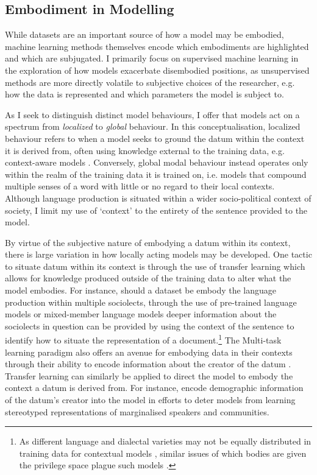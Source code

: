 \subsection{Embodiment in Modelling}

While datasets are an important source of how a model may be embodied, machine learning methods themselves encode which embodiments are highlighted and which are subjugated. I primarily focus on supervised machine learning in the exploration of how models exacerbate disembodied positions, as unsupervised methods are more directly volatile to subjective choices of the researcher, e.g. how the data is represented and which parameters the model is subject to.

As I seek to distinguish distinct model behaviours, I offer that models act on a spectrum from \textit{localized} to \textit{global} behaviour. In this conceptualisation, localized behaviour refers to when a model seeks to ground the datum within the context it is derived from, often using knowledge external to the training data, e.g. context-aware models \citep{Garcia:2019,Devlin:2019}. Conversely, global modal behaviour instead operates only within the realm of the training data it is trained on, i.e. models that compound multiple senses of a word with little or no regard to their local contexts. Although language production is situated within a wider socio-political context of society, I limit my use of `context' to the entirety of the sentence provided to the model.

By virtue of the subjective nature of embodying a datum within its context, there is large variation in how locally acting models may be developed. One tactic to situate datum within its context is through the use of transfer learning which allows for knowledge produced outside of the training data to alter what the model embodies. For instance, should a dataset be embody the language production within multiple sociolects, through the use of pre-trained language models \citep{Devlin:2019} or mixed-member language models \citep{Blodgett:2016} deeper information about the sociolects in question can be provided by using the context of the sentence to identify how to situate the representation of a document.\footnote{As different language and dialectal varieties may not be equally distributed in training data for contextual models \citep{Dunn:2020}, similar issues of which bodies are given the privilege space plague such models \citep{Tan-Celis:2019}.} The Multi-task learning paradigm also offers an avenue for embodying data in their contexts through their ability to encode information about the creator of the datum \citep{Benton:2017,Garcia:2019}. Transfer learning can similarly be applied to direct the model to embody the context a datum is derived from. For instance, \citet{Romanov:2019} encode demographic information of the datum's creator into the model in efforts to deter models from learning stereotyped representations of marginalised speakers and communities.

